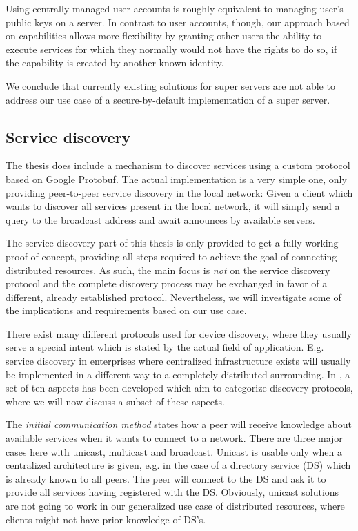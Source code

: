 Using centrally managed user accounts is roughly equivalent to managing user's public keys on a server.
In contrast to user accounts, though, our approach based on capabilities allows more flexibility by granting other users the ability to execute services for which they normally would not have the rights to do so, if the capability is created by another known identity.

We conclude that currently existing solutions for super servers are not able to address our use case of a secure-by-default implementation of a super server.

\subsection{Service discovery}

The thesis does include a mechanism to discover services using a custom protocol based on Google Protobuf.
The actual implementation is a very simple one, only providing peer-to-peer service discovery in the local network:
Given a client which wants to discover all services present in the local network, it will simply send a query to the broadcast address and await announces by available servers.

The service discovery part of this thesis is only provided to get a fully-working proof of concept, providing all steps required to achieve the goal of connecting distributed resources.
As such, the main focus is \emph{not} on the service discovery protocol and the complete discovery process may be exchanged in favor of a different, already established protocol.
Nevertheless, we will investigate some of the implications and requirements based on our use case.

There exist many different protocols used for device discovery, where they usually serve a special intent which is stated by the actual field of application.
E.g. service discovery in enterprises where centralized infrastructure exists will usually be implemented in a different way to a completely distributed surrounding.
In \cite{zhu2005service}, a set of ten aspects has been developed which aim to categorize discovery protocols, where we will now discuss a subset of these aspects.

The \emph{initial communication method} states how a peer will receive knowledge about available services when it wants to connect to a network.
There are three major cases here with unicast, multicast and broadcast.
Unicast is usable only when a centralized architecture is given, e.g. in the case of a directory service (DS) which is already known to all peers.
The peer will connect to the DS and ask it to provide all services having registered with the DS.
Obviously, unicast solutions are not going to work in our generalized use case of distributed resources, where clients might not have prior knowledge of DS's.

